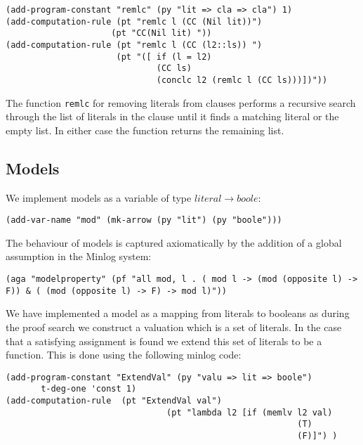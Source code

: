 \begin{lstlisting}[caption = "The Function Which Removes a Literal From a Clause"]
(add-program-constant "remlc" (py "lit => cla => cla") 1)
(add-computation-rule (pt "remlc l (CC (Nil lit))") 
                     (pt "CC(Nil lit) "))
(add-computation-rule (pt "remlc l (CC (l2::ls)) ")
                      (pt "([ if (l = l2)                                       
                              (CC ls)                                           
                              (conclc l2 (remlc l (CC ls)))])"))
\end{lstlisting}

The function \texttt{remlc} for removing literals from clauses performs a recursive search through the list of literals in the clause until it finds a matching literal or the empty list. In either case the function returns the remaining list.






\subsection*{Models}
We implement models as a variable of type $literal \to boole$:
\begin{center}
\texttt{(add-var-name "mod" (mk-arrow (py "lit") (py "boole")))}
\end{center}
The behaviour of models is captured axiomatically by the addition of a global assumption in the Minlog system:
\begin{center}
\texttt{(aga "modelproperty" (pf "all mod, l . ( mod l  -> (mod (opposite l) -> F)) \& ( (mod (opposite l) -> F) -> mod l)"))}
\end{center}
We have implemented a model as a mapping from literals to booleans as during the proof search we construct a valuation which is a set of literals. In the case that a satisfying assignment is found we extend this set of literals to be a function. This is done using the following minlog code:

\begin{lstlisting}[caption = "The ExtendVal function in Minlog"]
(add-program-constant "ExtendVal" (py "valu => lit => boole") 
       t-deg-one 'const 1)
(add-computation-rule  (pt "ExtendVal val")  
                                (pt "lambda l2 [if (memlv l2 val)                                                                                                       
                                                          (T)                                                                                                                        
                                                          (F)]") )
\end{lstlisting}



